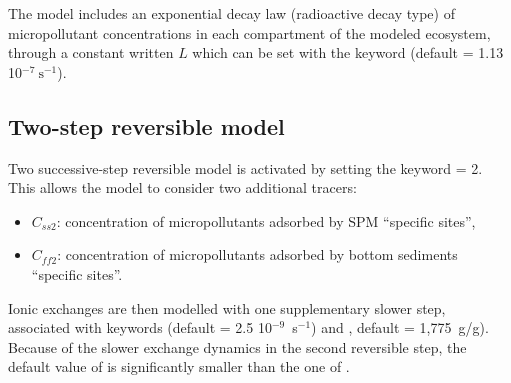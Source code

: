 The model includes an exponential decay law (radioactive decay type) of micropollutant
concentrations in each compartment of the modeled ecosystem,
through a constant written $L$
which can be set with the keyword
 (default = 1.13 10$^{-7}~\textrm{s}^{-1}$).

\subsection{Two-step reversible model}

Two successive-step reversible model is activated by setting the keyword  = 2.\\

This allows the model to consider two additional tracers:

\begin{itemize}
\item $C_{ss2}$: concentration of micropollutants adsorbed by SPM ``specific sites'',
\item $C_{ff2}$: concentration of micropollutants adsorbed by bottom sediments
  ``specific sites''.
\end{itemize}

Ionic exchanges are then modelled with one supplementary slower step, associated with
keywords  (default = 2.5 10$^{-9}$~s$^{-1}$)
and , default = 1,775~g/g).
Because of the slower exchange dynamics in the second reversible step, the default
value of  is significantly smaller than the
one of .
